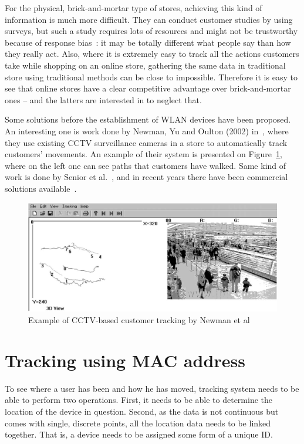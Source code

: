 \documentclass[12pt,a4paper,oneside,pdftex]{report}
\begin{document}
For the physical, brick-and-mortar type of stores, achieving this kind of information is much more difficult. They can conduct customer studies by using surveys, but such a study requires lots of resources and might not be trustworthy because of response bias~\cite{Furnham1986385}: it may be totally different what people say than how they really act. Also, where it is extremely easy to track all the actions customers take while shopping on an online store, gathering the same data in traditional store using traditional methods can be close to impossible. Therefore it is easy to see that online stores have a clear competitive advantage over brick-and-mortar ones -- and the latters are interested in to neglect that.

Some solutions before the establishment of WLAN devices have been proposed. An interesting one is work done by Newman, Yu and Oulton (2002) in~\cite{Newman2002253}, where they use existing CCTV surveillance cameras in a store to automatically track customers' movements. An example of their system is presented on Figure~\ref{fig:cctv_tracking}, where on the left one can see paths that customers have walked. Same kind of work is done by Senior et al.~\cite{senior2007video}, and in recent years there have been commercial solutions available~\cite{retailcctv}.

\begin{figure}
    \includegraphics[width=\textwidth]{images/cctv_tracking_newman_pic1}
    \caption{Example of CCTV-based customer tracking by Newman et al~\cite{Newman2002253}}
    \label{fig:cctv_tracking}
\end{figure}


\section{Tracking using MAC address}
\label{sec:mac_tracking}

To see where a user has been and how he has moved, tracking system needs to be able to perform two operations. First, it needs to be able to determine the location of the device in question. Second, as the data is not continuous but comes with single, discrete points, all the location data needs to be linked together. That is, a device needs to be assigned some form of a unique ID.
\end{document}
